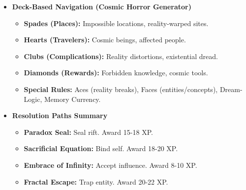 \documentclass[11pt]{article}
\begin{document}
\begin{itemize}
\item \textbf{Deck-Based Navigation (Cosmic Horror Generator)}
\begin{itemize}
\item \textbf{Spades (Places):} Impossible locations, reality-warped sites.
\item \textbf{Hearts (Travelers):} Cosmic beings, affected people.
\item \textbf{Clubs (Complications):} Reality distortions, existential dread.
\item \textbf{Diamonds (Rewards):} Forbidden knowledge, cosmic tools.
\item \textbf{Special Rules:} Aces (reality breaks), Faces (entities/concepts), Dream-Logic, Memory Currency.
\end{itemize}

\item \textbf{Resolution Paths Summary}
\begin{itemize}
\item \textbf{Paradox Seal:} Seal rift. Award 15-18 XP.
\item \textbf{Sacrificial Equation:} Bind self. Award 18-20 XP.
\item \textbf{Embrace of Infinity:} Accept influence. Award 8-10 XP.
\item \textbf{Fractal Escape:} Trap entity. Award 20-22 XP.
\end{itemize}
\end{itemize}


\end{document}
